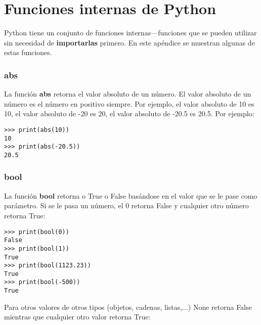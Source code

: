 

\chapter{Funciones internas de Python}\label{app:builtinfunctions}

Python tiene un conjunto de funciones internas---funciones que se pueden utilizar sin necesidad de \textbf{importarlas} primero.   En este apéndice se muestran algunas de estas funciones.

\subsection*{abs}

La función \textbf{abs} retorna el valor absoluto de un número.   El valor absoluto de un número es el número en positivo siempre.   Por ejemplo, el valor absoluto de 10 es 10, el valor absoluto de -20 es 20, el valor absoluto de -20.5 es 20.5.   Por ejemplo:

\begin{listing}
\begin{verbatim}
>>> print(abs(10))
10
>>> print(abs(-20.5))
20.5
\end{verbatim}
\end{listing}

\subsection*{bool}

La función \textbf{bool} retorna o True o False basándose en el valor que se le pase como parámetro.  Si se le pasa un número, el 0 retorna False y cualquier otro número retorna True:

\begin{listing}
\begin{verbatim}
>>> print(bool(0))
False
>>> print(bool(1))
True
>>> print(bool(1123.23))
True
>>> print(bool(-500))
True
\end{verbatim}
\end{listing}

Para otros valores de otros tipos (objetos, cadenas, listas,...) None retorna False mientras que cualquier otro valor retorna True:

